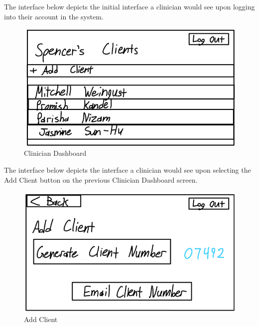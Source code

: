 \documentclass[12pt, titlepage]{article}
\begin{document}
\hspace{1.5em}The interface below depicts the initial interface a clinician would see upon logging into their account in the system.
\begin{figure}[H]
  \centering
  \includegraphics[scale=0.9]{images/Clinician-Dashboard.png}
  \caption{Clinician Dashboard}
\end{figure}

\hspace{1.5em}The interface below depicts the interface a clinician would see upon selecting the Add Client button on the previous Clinician Dashboard screen.
\begin{figure}[H]
  \centering
  \includegraphics[scale=0.9]{images/Add-Client.png}
  \caption{Add Client}
\end{figure}
\end{document}
